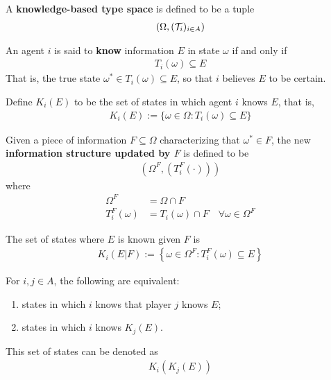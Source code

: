 \documentclass{article}
\begin{document}
    \begin{definition}
    	A \textbf{knowledge-based type space} is defined to be a tuple
    	\begin{align}
    		(\Omega, (\mathcal{{T}}_i)_{i \in A})
    	\end{align}
    \end{definition}
   
   	\begin{definition}
   		An agent $i$ is said to \textbf{know} information $E$ in state $\omega$ if and only if
   		\begin{align}
   			T_i(\omega) \subseteq E
   		\end{align}
   		That is, the true state $\omega^* \in T_i(\omega) \subseteq E$, so that $i$ believes $E$ to be certain.
   	\end{definition}
   	
   	\begin{definition}
   		Define $K_i(E)$ to be the set of states in which agent $i$ knows $E$, that is,
   		\begin{align}
   			K_i(E) := \{\omega \in \Omega: T_i(\omega) \subseteq E\}
   		\end{align}
   	\end{definition}
   	
   	\begin{definition}
   		Given a piece of information $F \subseteq \Omega$ characterizing that $\omega^* \in F$, the new \textbf{information structure updated by $F$} is defined to be
   		\begin{align}
   			(\Omega^F, (T^F_i(\cdot)))
   		\end{align}
   		where
   		\begin{align}
   			\Omega^F &= \Omega \cap F \\
   			T_i^F(\omega) &= T_i(\omega) \cap F\quad \forall \omega \in \Omega^F
   		\end{align}
   	\end{definition}
   	\begin{definition}
   		The set of states where $E$ is known given $F$ is 
   		\begin{align}
   			K_i(E|F) := \left\{
   			\omega \in \Omega^F: T_i^F(\omega) \subseteq E
   			\right\}
   		\end{align}
   	\end{definition}
   	
   	\begin{notation}
   		For $i, j \in A$, the following are equivalent:
   		\begin{enumerate}
   			\item states in which $i$ knows that player $j$ knows $E$;
   			\item states in which $i$ knows $K_j(E)$.
   		\end{enumerate}
   		This set of states can be denoted as
   		\begin{align}
   			K_i(K_j(E))
   		\end{align}
   	\end{notation}
   	
\end{document}
